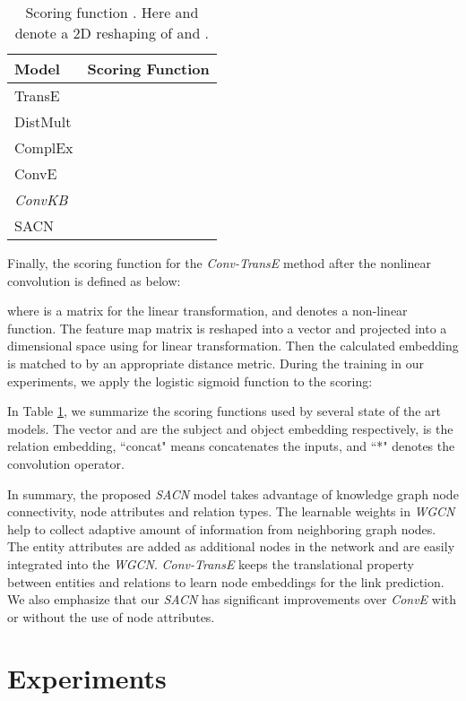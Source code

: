 \documentclass[letterpaper]{article} \usepackage{aaai19}  \usepackage{times}  \usepackage{helvet}  \usepackage{courier}  \usepackage{url}  \usepackage{graphicx}  \usepackage{amsmath}
\begin{document}
\begin{table}[t]
	\caption{Scoring function . Here  and  denote a 2D reshaping of  and .}
	\label{tbl:scoring}
	\smallskip
	\begin{center}
\begin{tabular}{|l|c|}
\hline
			Model & Scoring Function \\
			\hline
TransE 	 &   \\
			DistMult 	 &   \\
			ComplEx  &   \\
			ConvE 	 &     \\
			{\it ConvKB}  &  \\
			SACN  &  \\
			\hline
\end{tabular}
	\end{center}
	\vskip -0.25in
\end{table}

Finally, the scoring function for the {\it Conv-TransE} method after the nonlinear convolution is defined as below:

where  is a matrix for the linear transformation, and  denotes a non-linear function. The feature map matrix is reshaped into a vector  and projected into a  dimensional space using  for linear transformation. Then the calculated embedding is matched to  by an appropriate distance metric. During the training in our experiments, we apply the logistic sigmoid function to the scoring:


In Table \ref{tbl:scoring}, we summarize the scoring functions used by several state of the art models. The vector  and  are the subject and object embedding respectively,  is the relation embedding, ``concat" means concatenates the inputs, and ``*" denotes the convolution operator.


In summary, the proposed {\it SACN} model takes advantage of knowledge graph node connectivity, node attributes and relation types. The learnable weights in {\it WGCN} help to collect adaptive amount of information from neighboring graph nodes. The entity attributes are added as additional nodes in the network and are easily integrated into the {\it WGCN}. {\it Conv-TransE} keeps the translational property between entities and relations to learn node embeddings for the link prediction.
We also emphasize that our {\it SACN} has significant improvements over {\it ConvE} with or without the use of node attributes.

\section{Experiments}
\end{document}
